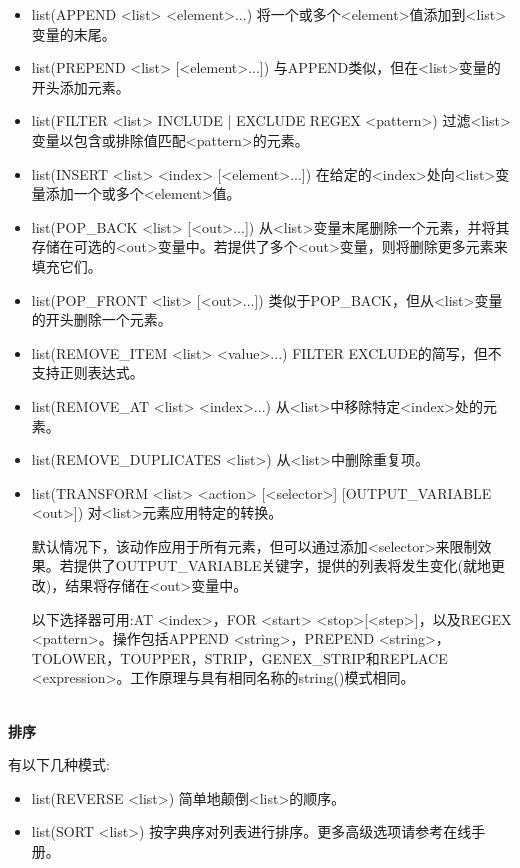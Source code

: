\begin{itemize}
\item 
list(APPEND <list> <element>...) 将一个或多个<element>值添加到<list>变量的末尾。

\item 
list(PREPEND <list> [<element>...]) 与APPEND类似，但在<list>变量的开头添加元素。

\item 
list(FILTER <list> {INCLUDE | EXCLUDE} REGEX <pattern>) 过滤<list>变量以包含或排除值匹配<pattern>的元素。

\item 
list(INSERT <list> <index> [<element>...]) 在给定的<index>处向<list>变量添加一个或多个<element>值。

\item 
list(POP\_BACK <list> [<out>...]) 从<list>变量末尾删除一个元素，并将其存储在可选的<out>变量中。若提供了多个<out>变量，则将删除更多元素来填充它们。

\item 
list(POP\_FRONT <list> [<out>...]) 类似于POP\_BACK，但从<list>变量的开头删除一个元素。

\item 
list(REMOVE\_ITEM <list> <value>...) FILTER EXCLUDE的简写，但不支持正则表达式。

\item 
list(REMOVE\_AT <list> <index>...) 从<list>中移除特定<index>处的元素。

\item 
list(REMOVE\_DUPLICATES <list>) 从<list>中删除重复项。

\item 
list(TRANSFORM <list> <action> [<selector>] [OUTPUT\_VARIABLE <out>]) 对<list>元素应用特定的转换。

默认情况下，该动作应用于所有元素，但可以通过添加<selector>来限制效果。若提供了OUTPUT\_VARIABLE关键字，提供的列表将发生变化(就地更改)，结果将存储在<out>变量中。

以下选择器可用:AT <index>，FOR <start> <stop>[<step>]，以及REGEX <pattern>。操作包括APPEND <string>，PREPEND <string>，TOLOWER，TOUPPER，STRIP，GENEX\_STRIP和REPLACE <expression>。工作原理与具有相同名称的string()模式相同。
\end{itemize}


\hspace*{\fill} \\ %
\noindent
\textbf{排序}

有以下几种模式:

\begin{itemize}
\item 
list(REVERSE <list>) 简单地颠倒<list>的顺序。

\item 
list(SORT <list>) 按字典序对列表进行排序。更多高级选项请参考在线手册。
\end{itemize}

